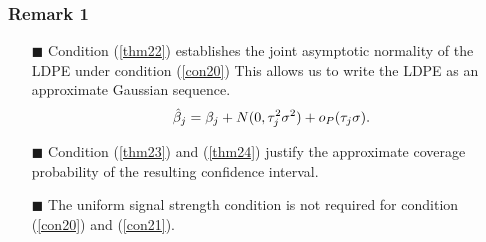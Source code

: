 \begin{frame}
\frametitle{Remark 1}
\begin{itemize}
\item[$\blacksquare$] Condition (\ref{thm22}) establishes the joint asymptotic normality of the LDPE under condition (\ref{con20})
    This allows us to write the LDPE as an approximate Gaussian sequence.
\begin{equation}
\setlength{\abovedisplayskip}{3pt}
\setlength{\belowdisplayskip}{3pt}
\label{Gauseq}
\hat{\beta}_j = \beta_j + N(0,\tau_j^2\sigma^2) + o_P(\tau_j\sigma).
\end{equation}

\item[$\blacksquare$] Condition (\ref{thm23}) and (\ref{thm24}) justify the approximate coverage probability of the resulting confidence interval.

\item[$\blacksquare$] The uniform signal strength condition is not required for condition (\ref{con20}) and (\ref{con21}).
\end{itemize}
\end{frame}



